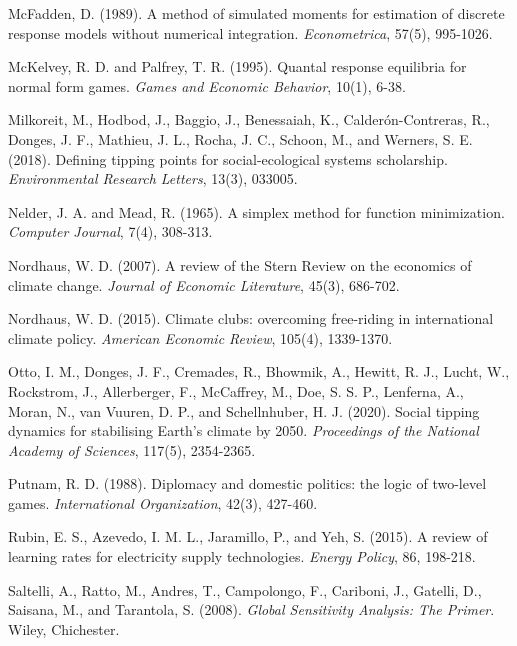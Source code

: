 \documentclass[10pt,a4paper]{article}
\begin{document}
\begin{list}{}{\setlength\leftmargin{1.5em}\setlength\itemindent{-1.5em}\setlength\itemsep{0.4em}}
\item McFadden, D. (1989). A method of simulated moments for estimation of discrete response models
without numerical integration. \textit{Econometrica}, 57(5), 995-1026.

\item McKelvey, R. D. and Palfrey, T. R. (1995). Quantal response equilibria for normal form games.
\textit{Games and Economic Behavior}, 10(1), 6-38.

\item Milkoreit, M., Hodbod, J., Baggio, J., Benessaiah, K., Calder\'{o}n-Contreras, R., Donges, J. F.,
Mathieu, J. L., Rocha, J. C., Schoon, M., and Werners, S. E. (2018). Defining tipping points for
social-ecological systems scholarship. \textit{Environmental Research Letters}, 13(3), 033005.

\item Nelder, J. A. and Mead, R. (1965). A simplex method for function minimization. \textit{Computer
Journal}, 7(4), 308-313.

\item Nordhaus, W. D. (2007). A review of the Stern Review on the economics of climate change.
\textit{Journal of Economic Literature}, 45(3), 686-702.

\item Nordhaus, W. D. (2015). Climate clubs: overcoming free-riding in international climate policy.
\textit{American Economic Review}, 105(4), 1339-1370.

\item Otto, I. M., Donges, J. F., Cremades, R., Bhowmik, A., Hewitt, R. J., Lucht, W., Rockstrom, J.,
Allerberger, F., McCaffrey, M., Doe, S. S. P., Lenferna, A., Moran, N., van Vuuren, D. P., and
Schellnhuber, H. J. (2020). Social tipping dynamics for stabilising Earth's climate by 2050.
\textit{Proceedings of the National Academy of Sciences}, 117(5), 2354-2365.

\item Putnam, R. D. (1988). Diplomacy and domestic politics: the logic of two-level games.
\textit{International Organization}, 42(3), 427-460.

\item Rubin, E. S., Azevedo, I. M. L., Jaramillo, P., and Yeh, S. (2015). A review of learning rates for
electricity supply technologies. \textit{Energy Policy}, 86, 198-218.

\item Saltelli, A., Ratto, M., Andres, T., Campolongo, F., Cariboni, J., Gatelli, D., Saisana, M., and
Tarantola, S. (2008). \textit{Global Sensitivity Analysis: The Primer}. Wiley, Chichester.


\end{list}
\end{document}
